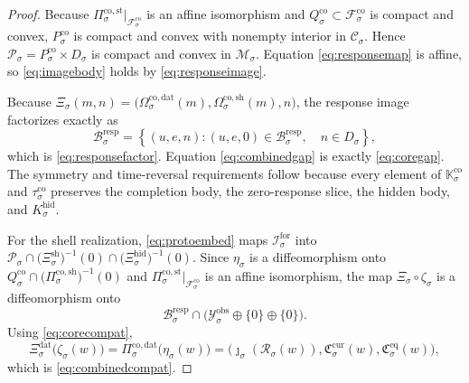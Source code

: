 \documentclass[11pt]{article}
\newcommand{\ForSpace}[1]{\mathcal I_{#1}^{\mathrm{for}}}
\newcommand{\Reduction}[1]{\mathcal R_{#1}}
\newcommand{\CurrentCarrier}[1]{\mathfrak C_{#1}^{\mathrm{cur}}}
\newcommand{\EqCarrier}[1]{\mathfrak C_{#1}^{\mathrm{eq}}}
\newcommand{\DataSpace}[1]{\mathcal Y_{#1}^{\mathrm{obs}}}
\newcommand{\ProtoSpace}[1]{\mathcal M_{#1}}
\newcommand{\ProtoBody}[1]{\mathcal P_{#1}}
\newcommand{\ResponseMap}[1]{\Xi_{#1}}
\newcommand{\ResponseData}[1]{\Xi_{#1}^{\mathrm{dat}}}
\newcommand{\ResponseShell}[1]{\Xi_{#1}^{\mathrm{sh}}}
\newcommand{\ResponseHidden}[1]{\Xi_{#1}^{\mathrm{hid}}}
\newcommand{\ResponseImage}[1]{\mathcal B_{#1}^{\mathrm{resp}}}
\newcommand{\GapBody}[1]{D_{#1}}
\newcommand{\HiddenOperator}[1]{K_{#1}^{\mathrm{hid}}}
\newcommand{\ProtoEmbed}[1]{\zeta_{#1}}
\newcommand{\CoreState}[1]{\mathcal C_{#1}}
\newcommand{\CoreAffine}[1]{\mathcal F_{#1}^{\mathrm{co}}}
\newcommand{\CoreBody}[1]{Q_{#1}^{\mathrm{co}}}
\newcommand{\CoreStateBody}[1]{P_{#1}^{\mathrm{co}}}
\newcommand{\CoreStateProj}[1]{\Pi_{#1}^{\mathrm{co,st}}}
\newcommand{\CoreDataProj}[1]{\Pi_{#1}^{\mathrm{co,dat}}}
\newcommand{\CoreShellProj}[1]{\Pi_{#1}^{\mathrm{co,sh}}}
\newcommand{\CoreDataMap}[1]{\Omega_{#1}^{\mathrm{co,dat}}}
\newcommand{\CoreShellMap}[1]{\Omega_{#1}^{\mathrm{co,sh}}}
\newcommand{\CoreSym}[1]{\mathbb K_{#1}^{\mathrm{co}}}
\newcommand{\CoreTime}[1]{\tau_{#1}^{\mathrm{co}}}
\newcommand{\CoreEmbed}[1]{\eta_{#1}}
\begin{document}
\begin{proof}
Because \(\CoreStateProj{\sigma}\big|_{\CoreAffine{\sigma}}\) is an affine isomorphism and \(\CoreBody{\sigma}\subset\CoreAffine{\sigma}\) is compact and convex, \(\CoreStateBody{\sigma}\) is compact and convex with nonempty interior in \(\CoreState{\sigma}\). Hence \(\ProtoBody{\sigma}=\CoreStateBody{\sigma}\times\GapBody{\sigma}\) is compact and convex in \(\ProtoSpace{\sigma}\). Equation \eqref{eq:responsemap} is affine, so \eqref{eq:imagebody} holds by \eqref{eq:responseimage}.

Because \(\ResponseMap{\sigma}(m,n)=\bigl(\CoreDataMap{\sigma}(m),\CoreShellMap{\sigma}(m),n\bigr)\), the response image factorizes exactly as
\[
\ResponseImage{\sigma}
=
\left\{
(u,e,n):
(u,e,0)\in\ResponseImage{\sigma},
\quad
n\in\GapBody{\sigma}
\right\},
\]
which is \eqref{eq:responsefactor}. Equation \eqref{eq:combinedgap} is exactly \eqref{eq:coregap}. The symmetry and time-reversal requirements follow because every element of \(\CoreSym{\sigma}\) and \(\CoreTime{\sigma}\) preserves the completion body, the zero-response slice, the hidden body, and \(\HiddenOperator{\sigma}\).

For the shell realization, \eqref{eq:protoembed} maps \(\ForSpace{\sigma}\) into \(\ProtoBody{\sigma}\cap\bigl(\ResponseShell{\sigma}\bigr)^{-1}(0)\cap\bigl(\ResponseHidden{\sigma}\bigr)^{-1}(0)\). Since \(\CoreEmbed{\sigma}\) is a diffeomorphism onto \(\CoreBody{\sigma}\cap\bigl(\CoreShellProj{\sigma}\bigr)^{-1}(0)\) and \(\CoreStateProj{\sigma}\big|_{\CoreAffine{\sigma}}\) is an affine isomorphism, the map \(\ResponseMap{\sigma}\circ\ProtoEmbed{\sigma}\) is a diffeomorphism onto
\[
\ResponseImage{\sigma}\cap
\bigl(
\DataSpace{\sigma}\oplus\{0\}\oplus\{0\}
\bigr).
\]
Using \eqref{eq:corecompat},
\[
\ResponseData{\sigma}\bigl(\ProtoEmbed{\sigma}(w)\bigr)
=
\CoreDataProj{\sigma}\bigl(\CoreEmbed{\sigma}(w)\bigr)
=
\bigl(
\jmath_{\sigma}(\Reduction{\sigma}(w)),
\CurrentCarrier{\sigma}(w),
\EqCarrier{\sigma}(w)
\bigr),
\]
which is \eqref{eq:combinedcompat}.


\end{proof}
\end{document}
